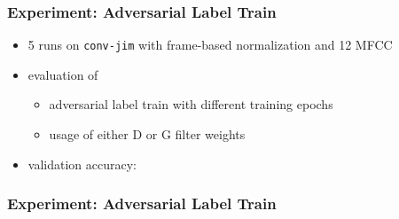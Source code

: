 \begin{frame}
  \frametitle{Experiment: Adversarial Label Train}
  \begin{itemize}
    \item 5 runs on \texttt{conv-jim} with frame-based normalization and 12 MFCC
    \item evaluation of
    \begin{itemize}
     \item adversarial label train with different training epochs
     \item usage of either D or G filter weights
    \end{itemize}
    \item validation accuracy:
    \vspace{-0.5cm}
    \begin{figure}[!ht]
    \centering
    \end{figure}
  \end{itemize}
\end{frame}

\begin{frame}
  \frametitle{Experiment: Adversarial Label Train}
  
\end{frame}

